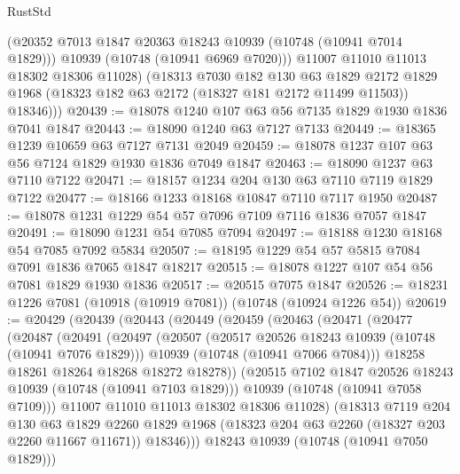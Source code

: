 \begin{lexlean}{RustStd}
\begin{coremodule}
            (@20352 @7013 @1847 @20363 @18243 @10939 (@10748 (@10941 @7014 @1829)))
            @10939
            (@10748 (@10941 @6969 @7020)))
          @11007
          @11010
          @11013
          @18302
          @18306
          @11028)
        (@18313
          @7030
          @182
          @130
          @63
          @1829
          @2172
          @1829
          @1968
          (@18323 @182 @63 @2172 (@18327 @181 @2172 @11499 @11503))
          @18346)))
@20439 := @18078 @1240 @107 @63 @56 @7135 @1829 @1930 @1836 @7041 @1847
@20443 := @18090 @1240 @63 @7127 @7133
@20449 := @18365 @1239 @10659 @63 @7127 @7131 @2049
@20459 := @18078 @1237 @107 @63 @56 @7124 @1829 @1930 @1836 @7049 @1847
@20463 := @18090 @1237 @63 @7110 @7122
@20471 := @18157 @1234 @204 @130 @63 @7110 @7119 @1829 @7122
@20477 := @18166 @1233 @18168 @10847 @7110 @7117 @1950
@20487 := @18078 @1231 @1229 @54 @57 @7096 @7109 @7116 @1836 @7057 @1847
@20491 := @18090 @1231 @54 @7085 @7094
@20497 := @18188 @1230 @18168 @54 @7085 @7092 @5834
@20507 := @18195 @1229 @54 @57 @5815 @7084 @7091 @1836 @7065 @1847 @18217
@20515 := @18078 @1227 @107 @54 @56 @7081 @1829 @1930 @1836
@20517 := @20515 @7075 @1847
@20526 := @18231 @1226 @7081 (@10918 (@10919 @7081)) (@10748 (@10924 @1226 @54))
@20619 := @20429
    (@20439
      (@20443
        (@20449
          (@20459
            (@20463
              (@20471
                (@20477
                  (@20487
                    (@20491
                      (@20497
                        (@20507
                          (@20517 @20526 @18243 @10939 (@10748 (@10941 @7076 @1829)))
                          @10939
                          (@10748 (@10941 @7066 @7084)))
                        @18258
                        @18261
                        @18264
                        @18268
                        @18272
                        @18278))
                    (@20515 @7102 @1847 @20526 @18243 @10939 (@10748 (@10941 @7103 @1829)))
                    @10939
                    (@10748 (@10941 @7058 @7109)))
                  @11007
                  @11010
                  @11013
                  @18302
                  @18306
                  @11028)
                (@18313
                  @7119
                  @204
                  @130
                  @63
                  @1829
                  @2260
                  @1829
                  @1968
                  (@18323 @204 @63 @2260 (@18327 @203 @2260 @11667 @11671))
                  @18346)))
            @18243
            @10939
            (@10748 (@10941 @7050 @1829)))

\end{coremodule}
\end{lexlean}
